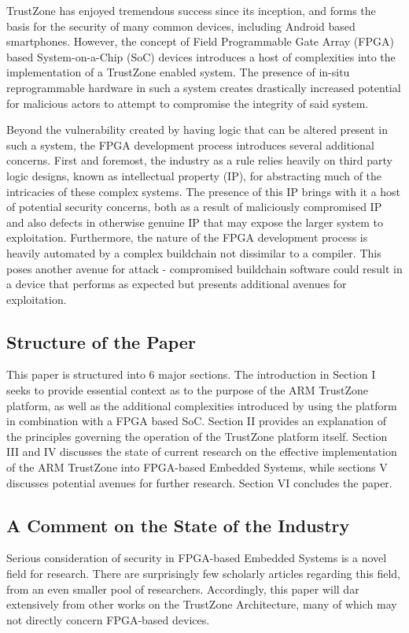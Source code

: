 \documentclass[journal]{IEEEtran}
\begin{document}
TrustZone has enjoyed tremendous success since its inception, and forms the basis for the
security of many common devices, including Android based smartphones. However, the concept
of Field Programmable Gate Array (FPGA) based System-on-a-Chip (SoC) devices introduces a
host of complexities into the implementation of a TrustZone enabled system. The
presence of in-situ reprogrammable hardware in such a system creates drastically increased
potential for malicious actors to attempt to compromise the integrity of said system.

Beyond the vulnerability created by having logic that can be altered present in such a
system, the FPGA development process introduces several additional concerns. First and
foremost, the industry as a rule relies heavily on third party logic designs, known as 
intellectual property (IP), for abstracting much of the intricacies of these complex 
systems. The presence of this IP brings with it a host of potential security concerns,
both as a result of maliciously compromised IP and also defects in otherwise genuine IP 
that may expose the larger system to exploitation. Furthermore, the nature of the FPGA
development process is heavily automated by a complex buildchain not dissimilar to a
compiler. This poses another avenue for attack - compromised buildchain software could
result in a device that performs as expected but presents additional avenues for
exploitation.

\subsection{Structure of the Paper}
This paper is structured into 6 major sections. The introduction in Section I seeks to
provide essential context as to the purpose of the ARM TrustZone platform, as well as the 
additional complexities introduced by using the platform in combination with a FPGA based 
SoC. Section II provides an explanation of the principles governing the operation of the 
TrustZone platform itself. Section III and IV discusses the state of current research on
the effective implementation of the ARM TrustZone into FPGA-based Embedded Systems, while 
sections V discusses potential avenues for further research. Section VI concludes 
the paper.

\subsection{A Comment on the State of the Industry}
Serious consideration of security in FPGA-based Embedded Systems is a novel field for
research. There are surprisingly few scholarly articles regarding this field, from an even
smaller pool of researchers. Accordingly, this paper will dar extensively from other works
on the TrustZone Architecture, many of which may not directly concern FPGA-based devices.
\end{document}
